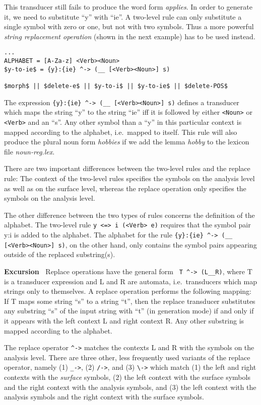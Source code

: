 \documentclass[11pt]{article}
\newenvironment{excursion}{

  \hrulefill\nopagebreak

  \textbf{Excursion~}}
{

  \nopagebreak\hrulefill\vspace{0.2cm}

}
\begin{document}
This transducer still fails to produce the word form \emph{applies}.
In order to generate it, we need to substitute ``y'' with ``ie''. A
two-level rule can only substitute a single symbol with zero or one,
but not with two symbols. Thus a more powerful \emph{string
replacement operation} (shown in the next example) has to be used
instead.

\begin{verbatim}
...
ALPHABET = [A-Za-z] <Verb><Noun>
$y-to-ie$ = {y}:{ie} ^-> (__ [<Verb><Noun>] s)

$morph$ || $delete-e$ || $y-to-i$ || $y-to-ie$ || $delete-POS$
\end{verbatim}

The expression \verb#{y}:{ie} ^-> (__ [<Verb><Noun>] s)# defines a
transducer which maps the string ``y'' to the string ``ie'' iff it is
followed by either \verb#<Noun># or \verb#<Verb># and an ``s''. Any
other symbol than a ``y'' in this particular context is mapped
according to the alphabet, i.e.\ mapped to itself. This rule will also
produce the plural noun form \emph{hobbies} if we add the lemma
\emph{hobby} to the lexicon file \emph{noun-reg.lex}.

There are two important differences between the two-level rules and
the replace rule: The context of the two-level rules specifies the
symbols on the analysis level as well as on the surface level, whereas
the replace operation only specifies the symbols on the analysis
level.

The other difference between the two types of rules concerns the
definition of the alphabet. The two-level rule
\verb#y <=> i (<Verb> e)# requires that the symbol pair y:i is added
to the alphabet. The alphabet for the rule
\verb#{y}:{ie} ^-> (__ [<Verb><Noun>] s)#, on the other hand, only
contains the symbol pairs appearing outside of the replaced
substring(s).

\begin{excursion}
  Replace operations have the general form \verb# T ^-> (L__R)#, where
  T is a transducer expression and L and R are automata, i.e.\ 
  transducers which map strings only to themselves. A replace
  operation performs the following mapping: If T maps some string
  ``s'' to a string ``t'', then the replace transducer substitutes any
  substring ``s'' of the input string with ``t'' (in generation mode)
  if and only if it appears with the left context L and right context
  R. Any other substring is mapped according to the alphabet.
  
  The replace operator \verb#^-># matches the contexts L and R with
  the symbols on the analysis level. There are three other, less
  frequently used variants of the replace operator, namely (1)
  \verb#_->#, (2) \verb#/->#, and (3) \verb#\-># which match (1) the
  left and right contexts with the \emph{surface} symbols, (2) the
  left context with the surface symbols and the right context with the
  analysis symbols, and (3) the left context with the analysis symbols
  and the right context with the surface symbols.
\end{excursion}
\end{document}
